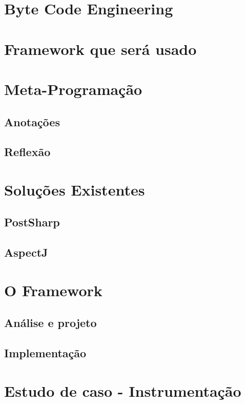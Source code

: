 \documentclass[tc,openright]{iiufrgs}
\begin{document}
\chapter{Byte Code Engineering}

\chapter{Framework que será usado}

\chapter{Meta-Programação}

\section{Anotações}

\section{Reflexão}

\chapter{Soluções Existentes}

\section{PostSharp}

\section{AspectJ}

\chapter{O Framework}

\section{Análise e projeto}

\section{Implementação}

\chapter{Estudo de caso - Instrumentação}
\end{document}
